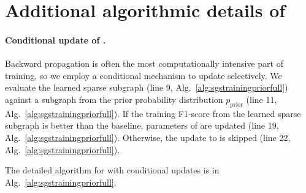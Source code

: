 \section{Additional algorithmic details of \sgs }
\label{app:algorithm}

\paragraph{Conditional update of \edgemlp.}
Backward propagation is often the most computationally intensive part of training, so we employ a conditional mechanism to update \edgemlp selectively. 
We evaluate the learned sparse subgraph (line 9, Alg.~\ref{alg:sgstrainingpriorfull}) against a subgraph from the prior probability distribution $p_\mathrm{prior}$ (line 11, Alg.~\ref{alg:sgstrainingpriorfull}). If the training F1-score from the learned sparse subgraph is better than the baseline, parameters of \edgemlp are updated (line 19, Alg.~\ref{alg:sgstrainingpriorfull}). Otherwise, the update to \edgemlp is skipped (line 22, Alg.~\ref{alg:sgstrainingpriorfull}). 

The detailed algorithm for \sgs with conditional updates is in Alg.~\ref{alg:sgstrainingpriorfull}.







